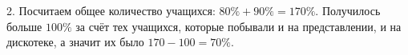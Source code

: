 2. Посчитаем общее количество учащихся: $80\%+90\%=170\%.$ Получилось больше $100\%$ за счёт тех учащихся, которые побывали и на представлении, и на дискотеке, а значит их было $170-100=70\%.$\\
